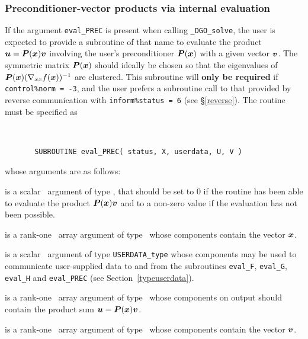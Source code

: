 \documentclass{galahad}
\newcommand{\packagename}{DGO}
\newcommand{\fullpackagename}{\libraryname\_\packagename}
\newcommand{\solver}{{\tt \fullpackagename\_solve}}
\begin{document}

\subsubsection{Preconditioner-vector products via internal evaluation\label{pv}}

If the argument {\tt eval\_PREC} is present when calling \solver, the
user is expected to provide a subroutine of that name to evaluate the
product ${\bm{u}} = {\bm{P}}({\bm{x}}) {\bm{v}}$ involving the user's preconditioner
${\bm{P}}({\bm{x}})$ with a given vector ${\bm{v}}$. The symmetric matrix ${\bm{P}}({\bm{x}})$
should ideally be chosen so that the eigenvalues of
${\bm{P}}({\bm{x}}) (\nabla_{xx} f({\bm{x}}))^{-1}$ are clustered. This subroutine
will {\bf only be required} if {\tt control\%norm = -3}, and the user prefers
a subroutine call to that provided by reverse communication 
with {\tt inform\%status = 6} (see \S\ref{reverse}).
The routine must be specified as

\def\baselinestretch{0.8}
{\tt
\begin{verbatim}
       SUBROUTINE eval_PREC( status, X, userdata, U, V )
\end{verbatim} }
\def\baselinestretch{1.0}
\noindent whose arguments are as follows:

\begin{description}
 is a scalar \intentout\ argument of type \integer,
that should be set to 0 if the routine has been able to evaluate the
product ${\bm{P}}({\bm{x}}) {\bm{v}}$
and to a non-zero value if the evaluation has not been possible.

 is a rank-one \intentin\ array argument of type \realdp\
whose components contain the vector ${\bm{x}}$.

 is a scalar \intentinout\ argument of type
{\tt USERDATA\_type} whose components may be used
to communicate user-supplied data to and from the
subroutines {\tt eval\_F}, {\tt eval\_G},
{\tt eval\_H} and {\tt eval\_PREC}
(see Section~\ref{typeuserdata}).

 is a rank-one \intentout\ array argument of type \realdp\
whose components on output should contain the product
sum ${\bm{u}} = {\bm{P}}({\bm{x}}) {\bm{v}}$.

 is a rank-one \intentin\ array argument of type \realdp\
whose components contain the vector ${\bm{v}}$.

\end{description}
\end{document}
